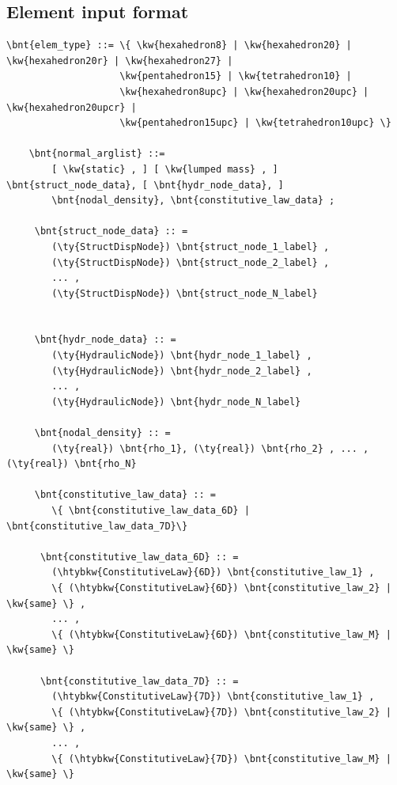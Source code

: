 \subsection{Element input format}
\begin{Verbatim}[commandchars=\\\{\}]
  \bnt{elem_type} ::= \{ \kw{hexahedron8} | \kw{hexahedron20} | \kw{hexahedron20r} | \kw{hexahedron27} |
                    \kw{pentahedron15} | \kw{tetrahedron10} |
                    \kw{hexahedron8upc} | \kw{hexahedron20upc} | \kw{hexahedron20upcr} |
                    \kw{pentahedron15upc} | \kw{tetrahedron10upc} \}

    \bnt{normal_arglist} ::=
        [ \kw{static} , ] [ \kw{lumped mass} , ] \bnt{struct_node_data}, [ \bnt{hydr_node_data}, ]
        \bnt{nodal_density}, \bnt{constitutive_law_data} ;

     \bnt{struct_node_data} :: =
        (\ty{StructDispNode}) \bnt{struct_node_1_label} ,
        (\ty{StructDispNode}) \bnt{struct_node_2_label} ,
        ... ,
        (\ty{StructDispNode}) \bnt{struct_node_N_label}


     \bnt{hydr_node_data} :: =
        (\ty{HydraulicNode}) \bnt{hydr_node_1_label} ,
        (\ty{HydraulicNode}) \bnt{hydr_node_2_label} ,
        ... ,
        (\ty{HydraulicNode}) \bnt{hydr_node_N_label}

     \bnt{nodal_density} :: =
        (\ty{real}) \bnt{rho_1}, (\ty{real}) \bnt{rho_2} , ... , (\ty{real}) \bnt{rho_N}

     \bnt{constitutive_law_data} :: =
        \{ \bnt{constitutive_law_data_6D} | \bnt{constitutive_law_data_7D}\}

      \bnt{constitutive_law_data_6D} :: =
        (\htybkw{ConstitutiveLaw}{6D}) \bnt{constitutive_law_1} ,
        \{ (\htybkw{ConstitutiveLaw}{6D}) \bnt{constitutive_law_2} | \kw{same} \} ,
        ... ,
        \{ (\htybkw{ConstitutiveLaw}{6D}) \bnt{constitutive_law_M} | \kw{same} \}

      \bnt{constitutive_law_data_7D} :: =
        (\htybkw{ConstitutiveLaw}{7D}) \bnt{constitutive_law_1} ,
        \{ (\htybkw{ConstitutiveLaw}{7D}) \bnt{constitutive_law_2} | \kw{same} \} ,
        ... ,
        \{ (\htybkw{ConstitutiveLaw}{7D}) \bnt{constitutive_law_M} | \kw{same} \}
\end{Verbatim}
